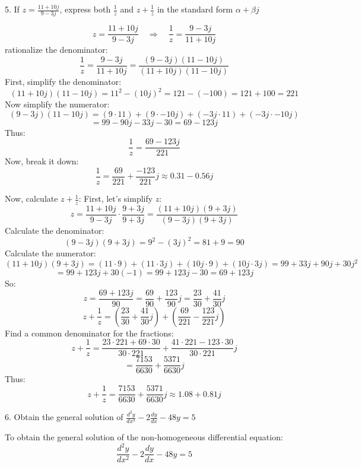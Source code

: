 \documentclass[a4paper, 12pt]{report}
\def\ni{green!60!black!40!white}
\begin{document}
    
    \newpage
    
    \begin{tcolorbox}[title={\color{black}\section{Q5}}, colback=white, colframe=\ni, boxrule=1mm, width=1\textwidth]
        5. If \( z = \frac{11 + 10{j}}{9 - 3{j}} \), express both \( \frac{1}{z} \) and \( z + \frac{1}{z} \) in the standard form \( \alpha + \beta {j} \)
    \end{tcolorbox}
    
    \[z = \frac{11 + 10{j}}{9 - 3 {j}} \quad\Rightarrow\quad \frac{1}{z} = \frac{9 - 3 {j}}{11 + 10{j}}\]
    rationalize the denominator:
    \[\frac{1}{z} = \frac{9 - 3 {j}}{11 + 10{j}} = \frac{(9 - 3 {j})(11 - 10 {j})}{(11 + 10 {j})(11 - 10 {j})}\]
    First, simplify the denominator:
    \[(11 + 10 {j})(11 - 10 {j}) = 11^2 - (10 {j})^2 = 121 - (-100) = 121 + 100 = 221\]
    Now simplify the numerator:
    \[(9 - 3 {j})(11 - 10 {j}) = (9\cdot11) + (9\cdot-10{j}) + (-3{j}\cdot 11) + (-3 {j}\cdot-10{j})\]
    \[= 99 - 90 {j} - 33 {j}-30 = 69-123 {j}\]
    Thus:
    \[\frac{1}{z} = \frac{69-123 {j}}{221}\]
    Now, break it down:
    \[\boxed{\frac{1}{z} = \frac{69}{221} + \frac{-123}{221} {j} \approx 0.31 - 0.56 {j}}\]

    Now, calculate \( z + \frac{1}{z} \):
    First, let's simplify \( z \):
    \[z = \frac{11 + 10j}{9 - 3j} \cdot \frac{9 + 3j}{9 + 3j} = \frac{(11 + 10j)(9 + 3j)}{(9 - 3j)(9 + 3j)}\]
    Calculate the denominator:
    \[(9 - 3j)(9 + 3j) = 9^2 - (3j)^2 = 81 + 9 = 90\]
    Calculate the numerator:
    \[(11 + 10j)(9 + 3j) = (11 \cdot 9) + (11 \cdot 3j) + (10j \cdot 9) + (10j \cdot 3j) = 99 + 33j + 90j + 30j^2\]
    \[= 99 + 123j + 30(-1) = 99 + 123j - 30 = 69 + 123j\]
    So:
    \[z = \frac{69 + 123j}{90} = \frac{69}{90} + \frac{123}{90}j = \frac{23}{30} + \frac{41}{30}j\]
    \[z + \frac{1}{z} = \left( \frac{23}{30} + \frac{41}{30}j \right) + \left( \frac{69}{221} - \frac{123}{221}j \right)\]
    Find a common denominator for the fractions:
    \[z + \frac{1}{z} = \frac{23 \cdot 221 + 69 \cdot 30}{30 \cdot 221} + \frac{41 \cdot 221 - 123 \cdot 30}{30 \cdot 221}j\]
    \[= \frac{7153}{6630} + \frac{5371}{6630}j\]
    Thus:
    \[\boxed{z + \frac{1}{z} = \frac{7153}{6630} + \frac{5371}{6630}j \approx 1.08 + 0.81j}\]


    \newpage
    
    \begin{tcolorbox}[title={\color{black}\section{Q6}}, colback=white, colframe=\ni, boxrule=1mm, width=1\textwidth]
        6. Obtain the general solution of \( \frac{d^2 y}{dx^2} - 2 \frac{dy}{dx} - 48y = 5 \)
    \end{tcolorbox}
        To obtain the general solution of the non-homogeneous differential equation:
        \[ \frac{d^2 y}{dx^2} - 2 \frac{dy}{dx} - 48y = 5 \]
        
\end{document}
